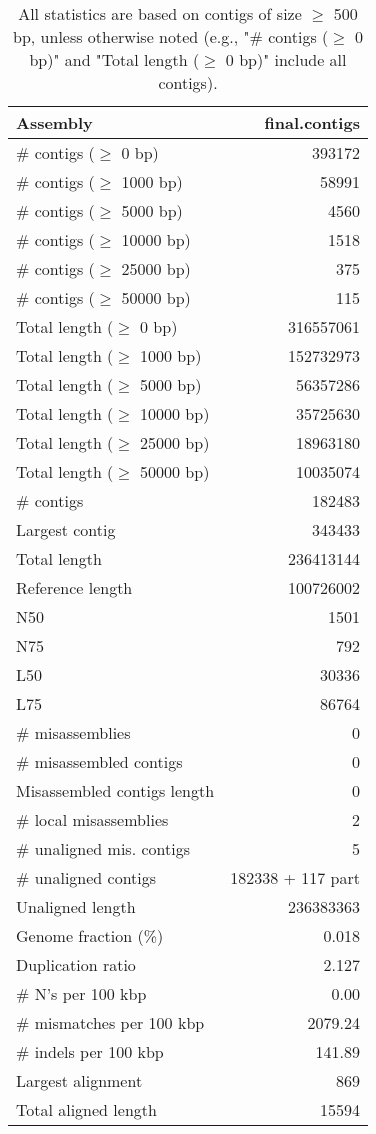\documentclass[12pt,a4paper]{article}
\begin{document}
\begin{table}[ht]
\begin{center}
\caption{All statistics are based on contigs of size $\geq$ 500 bp, unless otherwise noted (e.g., "\# contigs ($\geq$ 0 bp)" and "Total length ($\geq$ 0 bp)" include all contigs).}
\begin{tabular}{|l*{1}{|r}|}
\hline
Assembly & final.contigs \\ \hline
\# contigs ($\geq$ 0 bp) & 393172 \\ \hline
\# contigs ($\geq$ 1000 bp) & 58991 \\ \hline
\# contigs ($\geq$ 5000 bp) & 4560 \\ \hline
\# contigs ($\geq$ 10000 bp) & 1518 \\ \hline
\# contigs ($\geq$ 25000 bp) & 375 \\ \hline
\# contigs ($\geq$ 50000 bp) & 115 \\ \hline
Total length ($\geq$ 0 bp) & 316557061 \\ \hline
Total length ($\geq$ 1000 bp) & 152732973 \\ \hline
Total length ($\geq$ 5000 bp) & 56357286 \\ \hline
Total length ($\geq$ 10000 bp) & 35725630 \\ \hline
Total length ($\geq$ 25000 bp) & 18963180 \\ \hline
Total length ($\geq$ 50000 bp) & 10035074 \\ \hline
\# contigs & 182483 \\ \hline
Largest contig & 343433 \\ \hline
Total length & 236413144 \\ \hline
Reference length & 100726002 \\ \hline
N50 & 1501 \\ \hline
N75 & 792 \\ \hline
L50 & 30336 \\ \hline
L75 & 86764 \\ \hline
\# misassemblies & 0 \\ \hline
\# misassembled contigs & 0 \\ \hline
Misassembled contigs length & 0 \\ \hline
\# local misassemblies & 2 \\ \hline
\# unaligned mis. contigs & 5 \\ \hline
\# unaligned contigs & 182338 + 117 part \\ \hline
Unaligned length & 236383363 \\ \hline
Genome fraction (\%) & 0.018 \\ \hline
Duplication ratio & 2.127 \\ \hline
\# N's per 100 kbp & 0.00 \\ \hline
\# mismatches per 100 kbp & 2079.24 \\ \hline
\# indels per 100 kbp & 141.89 \\ \hline
Largest alignment & 869 \\ \hline
Total aligned length & 15594 \\ \hline
\end{tabular}
\end{center}
\end{table}
\end{document}

